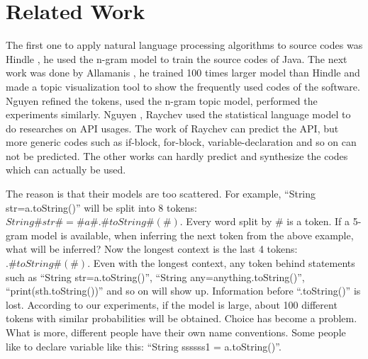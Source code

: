 \documentclass{sig-alternate-05-2015}
\begin{document}


\vspace{-0.2cm}
\section{Related Work}

The first one to apply natural language processing algorithms to source codes was Hindle \cite{DBLP:conf/icse/HindleBSGD12}, he used the n-gram \cite{cavnar1994n} model to train the source codes of Java. The next work was done by Allamanis \cite{DBLP:conf/msr/AllamanisS13a}, he trained 100 times larger model than Hindle and made a topic visualization tool to show the frequently used codes of the software. Nguyen \cite{DBLP:conf/sigsoft/NguyenNNN13} refined the tokens, used the n-gram topic \cite{wang2007topical} model, performed the experiments similarly. Nguyen \cite{DBLP:conf/icse/NguyenN15}, Raychev \cite{DBLP:conf/pldi/RaychevVY14} used the statistical language model to do researches on API usages. The work of Raychev can predict the API, but more generic codes such as if-block, for-block, variable-declaration and so on can not be predicted. The other works can hardly predict and synthesize the codes which can actually be used.

The reason is that their models are too scattered. For example, ``String str=a.toString()'' will be split into 8 tokens: $String\#str\#=\#a\#.\#toString\#(\#)$. Every word split by $\#$ is a token. If a 5-gram model is available, when inferring the next token from the above example, what will be inferred? Now the longest context is the last 4 tokens: $.\#toString\#(\#)$. Even with the longest context, any token behind statements such as ``String str=a.toString()'', ``String any=anything.toString()'', ``print(sth.toString())'' and so on will show up. Information before ``.toString()'' is lost. According to our experiments, if the model is large, about 100 different tokens with similar probabilities will be obtained. Choice has become a problem. What is more, different people have their own name conventions. Some people like to declare variable like this: ``String ssssss1 = a.toString()''.
\end{document}
